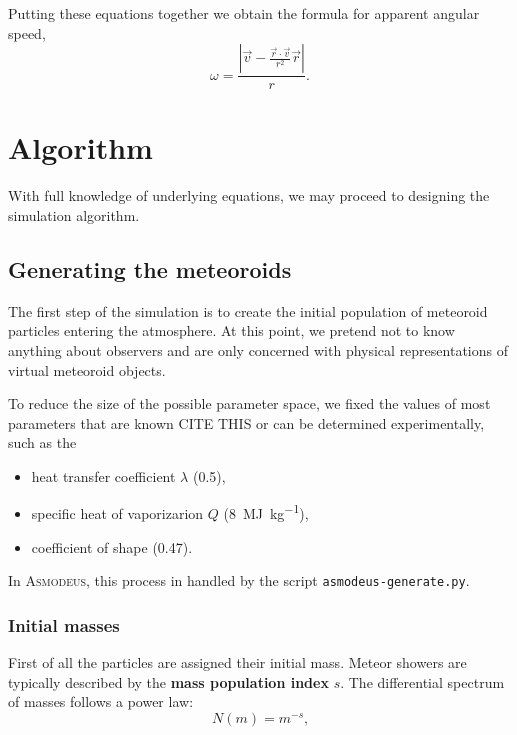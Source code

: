             Putting these equations together we obtain the formula for apparent angular speed,
            \begin{equation}
                \omega = \frac{\left|\vec{v} - \frac{\vec{r}\cdot\vec{v}}{r^2}\vec{r}\right|}{r}\text{.}
                \label{sim:pmf:sq:as:asf}
            \end{equation}

\section{Algorithm}
    With full knowledge of underlying equations, we may proceed to designing the simulation algorithm.

    \subsection{Generating the meteoroids}
        The first step of the simulation is to create the initial population of meteoroid particles entering the atmosphere.
        At this point, we pretend not to know anything about observers and are only concerned with
        physical representations of virtual meteoroid objects.
        
        To reduce the size of the possible parameter space, we fixed the values of most
        parameters that are known CITE THIS or can be determined experimentally, such as the        
        \begin{itemize}
            \item heat transfer coefficient $\lambda$ (\num{0.5}),
            \item specific heat of vaporizarion $Q$ (\SI{8}{\mega\joule\per\kilo\gram}),
            \item coefficient of shape (\num{0.47}).
        \end{itemize}

        In \textsc{Asmodeus}, this process in handled by the script \texttt{asmodeus-generate.py}.
        
        \subsubsection{Initial masses}
            First of all the particles are assigned their initial mass. Meteor showers are typically described
            by the \textbf{mass population index} $s$. The differential spectrum of masses follows a power law:
            \begin{equation}
                N(m) = m^{-s}\text{,}
            \end{equation}
            
